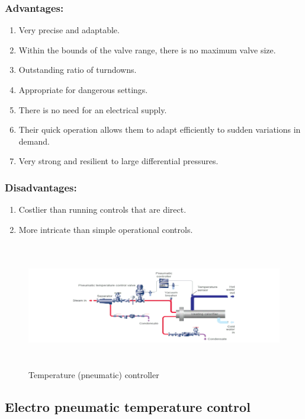 \subsubsection{Advantages:}

\begin{enumerate}
\item
  Very precise and adaptable.
\item
  Within the bounds of the valve range, there is no maximum valve size.
\item
  Outstanding ratio of turndowns.
\item
  Appropriate for dangerous settings.
\item
  There is no need for an electrical supply.
\item
  Their quick operation allows them to adapt efficiently to sudden
  variations in demand.
\item
  Very strong and resilient to large differential pressures.
\end{enumerate}

\subsubsection{Disadvantages:}

\begin{enumerate}
\item
  Costlier than running controls that are direct.
\item
  More intricate than simple operational controls.
\end{enumerate}

\begin{figure}[h!]
  \centering
  \includegraphics[width=6.14961in,height=2.16177in]{figs/control_instrumentation/image3.png}
  \caption{Temperature (pneumatic) controller}
  \label{fig:Temperature (pneumatic) controller}
\end{figure}


\subsection{Electro pneumatic temperature control}

